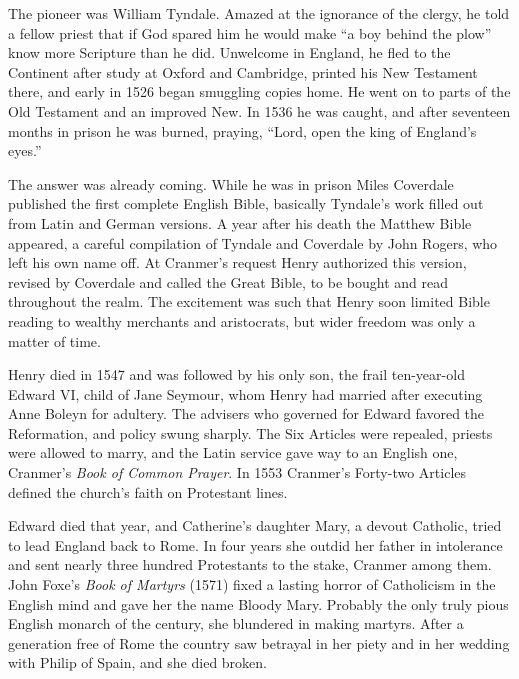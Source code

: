 The pioneer was William Tyndale. Amazed at the ignorance of the clergy, he told a fellow priest that
if God spared him he would make ``a boy behind the plow'' know more Scripture than he did. Unwelcome
in England, he fled to the Continent after study at Oxford and Cambridge, printed his New Testament
there, and early in 1526 began smuggling copies home. He went on to parts of the Old Testament and an
improved New. In 1536 he was caught, and after seventeen months in prison he was burned, praying,
``Lord, open the king of England's eyes.''

The answer was already coming. While he was in prison Miles Coverdale published the first complete
English Bible, basically Tyndale's work filled out from Latin and German versions. A year after his
death the Matthew Bible appeared, a careful compilation of Tyndale and Coverdale by John Rogers, who
left his own name off. At Cranmer's request Henry authorized this version, revised by Coverdale and
called the Great Bible, to be bought and read throughout the realm. The excitement was such that
Henry soon limited Bible reading to wealthy merchants and aristocrats, but wider freedom was only a
matter of time.

Henry died in 1547 and was followed by his only son, the frail ten-year-old Edward VI, child of Jane
Seymour, whom Henry had married after executing Anne Boleyn for adultery. The advisers who governed
for Edward favored the Reformation, and policy swung sharply. The Six Articles were repealed, priests
were allowed to marry, and the Latin service gave way to an English one, Cranmer's \emph{Book of Common Prayer}. In 1553 Cranmer's Forty-two Articles defined the church's faith on Protestant lines.

Edward died that year, and Catherine's daughter Mary, a devout Catholic, tried to lead England back
to Rome. In four years she outdid her father in intolerance and sent nearly three hundred Protestants
to the stake, Cranmer among them. John Foxe's \emph{Book of Martyrs} (1571) fixed a lasting horror of
Catholicism in the English mind and gave her the name Bloody Mary. Probably the only truly pious
English monarch of the century, she blundered in making martyrs. After a generation free of Rome the
country saw betrayal in her piety and in her wedding with Philip of Spain, and she died broken.

